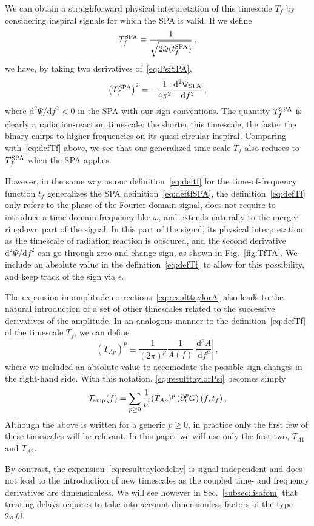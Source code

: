 \documentclass[aps,showpacs,twocolumn,
prd,superscriptaddress,nofootinbib]{revtex4-1}
\newcommand{\be}{\begin{equation}}
\newcommand{\ee}{\end{equation}}
\newcommand\ud{{\mathrm{d}}}
\newcommand\calT{{\mathcal{T}}}
\newcommand{\tf}{t_{f}}
\newcommand{\Tf}{T_{f}}
\newcommand{\tfSPA}{t_{f}^{\rm SPA}}
\begin{document}
We can obtain a straighforward physical interpretation of this timescale $\Tf$ by considering inspiral signals for which the SPA is valid. If we define
\be\label{eq:TfSPA}
	\Tf^{\rm SPA} \equiv \frac{1}{\sqrt{2\dot{\omega}(\tfSPA)}} \,,
\ee
we have, by taking two derivatives of~\eqref{eq:PsiSPA},
\be
	\left(\Tf^{\rm SPA} \right)^{2} = -\frac{1}{4\pi^{2}}  \frac{\ud^{2} \Psi_{\rm SPA}}{\ud f^{2}} \,,
\ee
where $\ud^{2}\Psi/\ud f^{2} < 0$ in the SPA with our sign conventions. The quantity $\Tf^{\rm SPA}$ is clearly a radiation-reaction timescale: the shorter this timescale, the faster the binary chirps to higher frequencies on its quasi-circular inspiral. Comparing with~\eqref{eq:defTf} above, we see that our generalized time scale $\Tf$ also reduces to $\Tf^{\rm SPA}$ when the SPA applies.

However, in the same way as our definition~\eqref{eq:deftf} for the time-of-frequency function $t_{f}$ generalizes the SPA definition~\eqref{eq:deftfSPA}, the definition~\eqref{eq:defTf} only refers to the phase of the Fourier-domain signal, does not require to introduce a time-domain frequency like $\omega$, and extends naturally to the merger-ringdown part of the signal. In this part of the signal, its physical interpretation as the timescale of radiation reaction is obscured, and the second derivative $\ud^{2}\Psi/\ud f^{2}$ can go through zero and change sign, as shown in Fig.~\ref{fig:TfTA}. We include an absolute value in the definition~\eqref{eq:defTf} to allow for this possibility, and keep track of the sign via $\epsilon$.

The expansion in amplitude corrections~\eqref{eq:resulttaylorA} also leads to the natural introduction of a set of other timescales related to the successive derivatives of the amplitude. In an analogous manner to the definition~\eqref{eq:defTf} of the timescale $\Tf$, we can define
\be\label{eq:defTA}
	\left( T_{Ap} \right)^{p} \equiv \frac{1}{(2 \pi)^{p}} \frac{1}{A(f)} \left| \frac{\ud^{p} A}{\ud f^{p}} \right| \,,
\ee
where we included an absolute value to accomodate the possible sign changes in the right-hand side. With this notation, \eqref{eq:resulttaylorPsi} becomes simply
\be\label{eq:resulttaylorA}
	\calT_{\rm amp}(f) = \sum\limits_{p\geq 0} \frac{1}{p!} (T_{Ap})^{p}  \left( \partial_{t}^{p} G \right) (f,\tf) \,,
\ee
Although the above is written for a generic $p\geq 0$, in practice only the first few of these timescales will be relevant. In this paper we will use only the first two, $T_{A1}$ and $T_{A2}$.

By contrast, the expansion~\eqref{eq:resulttaylordelay} is signal-independent and does not lead to the introduction of new timescales as the coupled time- and frequency derivatives are dimensionless. We will see however in Sec.~\ref{subsec:lisafom} that treating delays requires to take into account dimensionless factors of the type $2\pi f d$.
\end{document}
